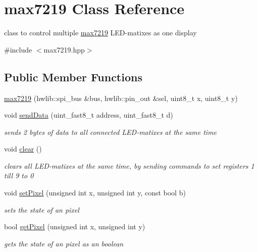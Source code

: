 \hypertarget{classmax7219}{}\section{max7219 Class Reference}
\label{classmax7219}


class to control multiple \mbox{\hyperlink{classmax7219}{max7219}} L\+E\+D-\/matixes as one display  




{\ttfamily \#include $<$max7219.\+hpp$>$}

\subsection*{Public Member Functions}
\begin{DoxyCompactItemize}
\item 
\mbox{\hyperlink{classmax7219_a892f1c436090d79718d264e3f8fe0029}{max7219}} (hwlib\+::spi\+\_\+bus \&bus, hwlib\+::pin\+\_\+out \&sel, uint8\+\_\+t x, uint8\+\_\+t y)
\item 
void \mbox{\hyperlink{classmax7219_ab63d56bdc1aa6f1fd2dd4290737d3303}{send\+Data}} (uint\+\_\+fast8\+\_\+t address, uint\+\_\+fast8\+\_\+t d)
\begin{DoxyCompactList}\small\item\em sends 2 bytes of data to all connected L\+E\+D-\/matixes at the same time \end{DoxyCompactList}\item 
void \mbox{\hyperlink{classmax7219_a285fdbbb7c29dcaa10634ac6756d7b49}{clear}} ()
\begin{DoxyCompactList}\small\item\em clears all L\+E\+D-\/matixes at the same time, by sending commands to set registers 1 till 9 to 0 \end{DoxyCompactList}\item 
void \mbox{\hyperlink{classmax7219_a7f1ed36b8de02c39eb7cdbdd6348ae8a}{set\+Pixel}} (unsigned int x, unsigned int y, const bool b)
\begin{DoxyCompactList}\small\item\em sets the state of an pixel \end{DoxyCompactList}\item 
bool \mbox{\hyperlink{classmax7219_a50efeaec89dc19034359967de0c5fe97}{get\+Pixel}} (unsigned int x, unsigned int y)
\begin{DoxyCompactList}\small\item\em gets the state of an pixel as an boolean \end{DoxyCompactList}\item 

\end{DoxyCompactItemize}
